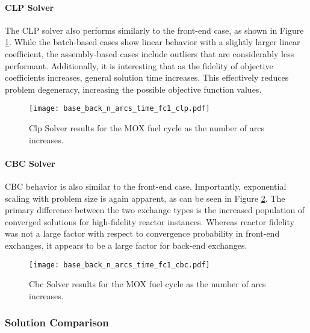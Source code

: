 \paragraph{CLP Solver}

The CLP solver also performs similarly to the front-end case, as shown in Figure
\ref{fig:base_back_n_arcs_time_fc1_clp}. While the batch-based cases show linear
behavior with a slightly larger linear coefficient, the assembly-based cases
include outliers that are considerably less performant. Additionally, it is
interesting that as the fidelity of objective coefficients increases, general
solution time increases. This effectively reduces problem degeneracy, increasing
the possible objective function values.

\begin{figure}[h!]
  \begin{center}
    \texttt{[image: base\_back\_n\_arcs\_time\_fc1\_clp.pdf]}
    \caption{
      \label{fig:base_back_n_arcs_time_fc1_clp}
      Clp Solver results for the MOX fuel cycle as the number of arcs
      increases.      
    }
  \end{center}
\end{figure}

\paragraph{CBC Solver}

CBC behavior is also similar to the front-end case. Importantly, exponential
scaling with problem size is again apparent, as can be seen in Figure
\ref{fig:base_back_n_arcs_time_fc1_cbc}. The primary difference between the two
exchange types is the increased population of converged solutions for
high-fidelity reactor instances. Whereas reactor fidelity was not a large factor
with respect to convergence probability in front-end exchanges, it appears to be
a large factor for back-end exchanges.
 
\begin{figure}[h!]
  \begin{center}
    \texttt{[image: base\_back\_n\_arcs\_time\_fc1\_cbc.pdf]}
    \caption{
      \label{fig:base_back_n_arcs_time_fc1_cbc}
      Cbc Solver results for the MOX fuel cycle as the number of arcs
      increases.      
    }
  \end{center}
\end{figure}

\subsubsection{Solution Comparison}\label{sec:res:scale:front:soln}

